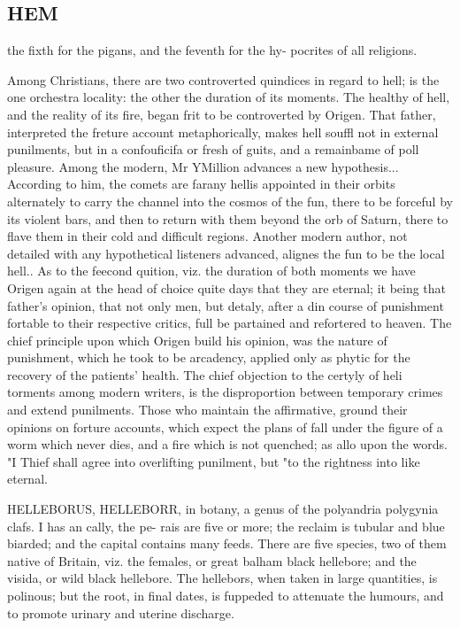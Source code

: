 \subsection*{HEM}
the fixth for the pigans, and the feventh for the hy- pocrites of all religions.\par\medskip
Among Christians, there are two controverted quindices in regard to hell; is the one orchestra locality: the other the duration of its moments. The healthy of hell, and the reality of its fire, began frit to be controverted by Origen. That father, interpreted the freture account metaphorically, makes hell souffl not in external punilments, but in a confouficifa or fresh of guits, and a remainbame of poll pleasure. Among the modern, Mr YMillion advances a new hypothesis... According to him, the comets are farany hellis appointed in their orbits alternately to carry the channel into the cosmos of the fun, there to be forceful by its violent bars, and then to return with them beyond the orb of Saturn, there to flave them in their cold and difficult regions. Another modern author, not detailed with any hypothetical listeners advanced, alignes the fun to be the local hell.. As to the feecond quition, viz. the duration of both moments we have Origen again at the head of choice quite days that they are eternal; it being that father’s opinion, that not only men, but detaly, after a din course of punishment fortable to their respective critics, full be partained and refortered to heaven. The chief principle upon which Origen build his opinion, was the nature of punishment, which he took to be arcadency, applied only as phytic for the recovery of the patients' health. The chief objection to the certyly of heli torments among modern writers, is the disproportion between temporary crimes and extend punilments. Those who maintain the affirmative, ground their opinions on forture accounts, which expect the plans of fall under the figure of a worm which never dies, and a fire which is not quenched; as allo upon the words. "I Thief shall agree into overlifting punilment, but "to the rightness into like eternal.\par\medskip
HELLEBORUS, HELLEBORR, in botany, a genus of the polyandria polygynia clafs. I has an cally, the pe- rais are five or more; the reclaim is tubular and blue biarded; and the capital contains many feeds. There are five species, two of them native of Britain, viz. the females, or great balham black hellebore; and the visida, or wild black hellebore. The hellebors, when taken in large quantities, is polinous; but the root, in final dates, is fuppeded to attenuate the humours, and to promote urinary and uterine discharge.\par\medskip
